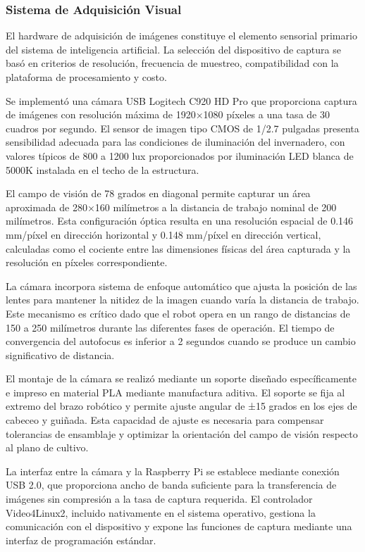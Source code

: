 \subsubsection{Sistema de Adquisición Visual}

El hardware de adquisición de imágenes constituye el elemento sensorial primario del sistema de inteligencia artificial. La selección del dispositivo de captura se basó en criterios de resolución, frecuencia de muestreo, compatibilidad con la plataforma de procesamiento y costo.

Se implementó una cámara USB Logitech C920 HD Pro que proporciona captura de imágenes con resolución máxima de 1920×1080 píxeles a una tasa de 30 cuadros por segundo. El sensor de imagen tipo CMOS de 1/2.7 pulgadas presenta sensibilidad adecuada para las condiciones de iluminación del invernadero, con valores típicos de 800 a 1200 lux proporcionados por iluminación LED blanca de 5000K instalada en el techo de la estructura.

El campo de visión de 78 grados en diagonal permite capturar un área aproximada de 280×160 milímetros a la distancia de trabajo nominal de 200 milímetros. Esta configuración óptica resulta en una resolución espacial de 0.146 mm/píxel en dirección horizontal y 0.148 mm/píxel en dirección vertical, calculadas como el cociente entre las dimensiones físicas del área capturada y la resolución en píxeles correspondiente.

La cámara incorpora sistema de enfoque automático que ajusta la posición de las lentes para mantener la nitidez de la imagen cuando varía la distancia de trabajo. Este mecanismo es crítico dado que el robot opera en un rango de distancias de 150 a 250 milímetros durante las diferentes fases de operación. El tiempo de convergencia del autofocus es inferior a 2 segundos cuando se produce un cambio significativo de distancia.

El montaje de la cámara se realizó mediante un soporte diseñado específicamente e impreso en material PLA mediante manufactura aditiva. El soporte se fija al extremo del brazo robótico y permite ajuste angular de ±15 grados en los ejes de cabeceo y guiñada. Esta capacidad de ajuste es necesaria para compensar tolerancias de ensamblaje y optimizar la orientación del campo de visión respecto al plano de cultivo.


La interfaz entre la cámara y la Raspberry Pi se establece mediante conexión USB 2.0, que proporciona ancho de banda suficiente para la transferencia de imágenes sin compresión a la tasa de captura requerida. El controlador Video4Linux2, incluido nativamente en el sistema operativo, gestiona la comunicación con el dispositivo y expone las funciones de captura mediante una interfaz de programación estándar.

